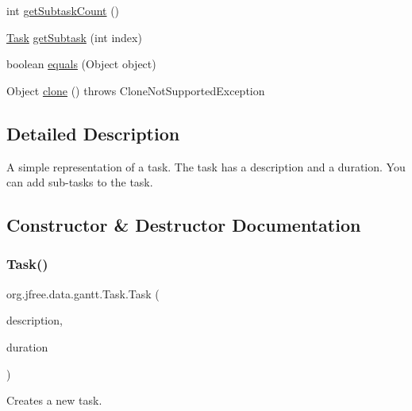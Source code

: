 \begin{DoxyCompactItemize}
\item 
int \mbox{\hyperlink{classorg_1_1jfree_1_1data_1_1gantt_1_1_task_ae9bd48c7e0e0220aae6aee29f1e73f60}{get\+Subtask\+Count}} ()
\item 
\mbox{\hyperlink{classorg_1_1jfree_1_1data_1_1gantt_1_1_task}{Task}} \mbox{\hyperlink{classorg_1_1jfree_1_1data_1_1gantt_1_1_task_a768f34d2fabe792c3a123e813ee4d16e}{get\+Subtask}} (int index)
\item 
boolean \mbox{\hyperlink{classorg_1_1jfree_1_1data_1_1gantt_1_1_task_a184c6853b7b17afce298836701f0dcd3}{equals}} (Object object)
\item 
Object \mbox{\hyperlink{classorg_1_1jfree_1_1data_1_1gantt_1_1_task_a04808ca5a58846b9a21f6d8bf7cbf3a7}{clone}} ()  throws Clone\+Not\+Supported\+Exception 
\end{DoxyCompactItemize}


\subsection{Detailed Description}
A simple representation of a task. The task has a description and a duration. You can add sub-\/tasks to the task. 

\subsection{Constructor \& Destructor Documentation}
\mbox{\label{classorg_1_1jfree_1_1data_1_1gantt_1_1_task_a8c6869db85eec9ecef3e4a9ee2fbb399}} 
\subsubsection{\texorpdfstring{Task()}{Task()}\hspace{0.1cm}{\footnotesize\ttfamily [1/2]}}
{\footnotesize\ttfamily org.\+jfree.\+data.\+gantt.\+Task.\+Task (\begin{DoxyParamCaption}\item[{String}]{description,  }\item[{\mbox{\hyperlink{interfaceorg_1_1jfree_1_1data_1_1time_1_1_time_period}{Time\+Period}}}]{duration }\end{DoxyParamCaption})}

Creates a new task.


